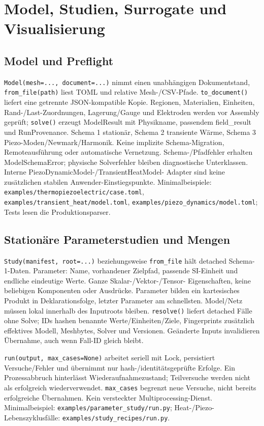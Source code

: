 \chapter{Model, Studien, Surrogate und Visualisierung}
\label{api:workflows}
\begingroup\raggedright
\section{Model und Preflight}
\texttt{Model(mesh=..., document=...)} nimmt einen unabhängigen Dokumentstand,
\texttt{from\_file(path)} liest TOML und relative Mesh-/CSV-Pfade.
\texttt{to\_document()} liefert eine getrennte JSON-kompatible Kopie.
Regionen, Materialien, Einheiten, Rand-/Last-Zuordnungen, Lagerung/Gauge und
Elektroden werden vor Assembly geprüft; \texttt{solve()} erzeugt ModelResult
mit Physikname, passendem field\_result und RunProvenance. Schema 1 stationär,
Schema 2 transiente Wärme, Schema 3 Piezo-Moden/Newmark/Harmonik.
Keine implizite Schema-Migration, Remoteausführung oder automatische Vernetzung.
Schema-/Pfadfehler erhalten ModelSchemaError; physische Solverfehler bleiben
diagnostische Unterklassen. Interne PiezoDynamicModel-/TransientHeatModel-
Adapter sind keine zusätzlichen stabilen Anwender-Einstiegspunkte.
Minimalbeispiele: \nolinkurl{examples/thermopiezoelectric/case.toml},
\nolinkurl{examples/transient_heat/model.toml},
\nolinkurl{examples/piezo_dynamics/model.toml}; Tests lesen die Produktionsparser.

\section{Stationäre Parameterstudien und Mengen}
\texttt{Study(manifest, root=...)} beziehungsweise \texttt{from\_file}
hält detached Schema-1-Daten. Parameter: Name, vorhandener Zielpfad,
passende SI-Einheit und endliche eindeutige Werte. Ganze Skalar-/Vektor-/Tensor-
Eigenschaften, keine beliebigen Komponenten oder Ausdrücke. Parameter bilden
ein kartesisches Produkt in Deklarationsfolge, letzter Parameter am schnellsten.
Model/Netz müssen lokal innerhalb des Inputroots bleiben. \texttt{resolve()}
liefert detached Fälle ohne Solve; IDs hashen benannte Werte/Einheiten/Ziele,
Fingerprints zusätzlich effektives Modell, Meshbytes, Solver und Versionen.
Geänderte Inputs invalidieren Übernahme, auch wenn Fall-ID gleich bleibt.

\texttt{run(output, max\_cases=None)} arbeitet seriell mit Lock, persistiert
Versuche/Fehler und übernimmt nur hash-/identitätsgeprüfte Erfolge. Ein
Prozessabbruch hinterlässt Wiederaufnahmezustand; Teilversuche werden nicht
als erfolgreich wiederverwendet. \texttt{max\_cases} begrenzt neue Versuche,
nicht bereits erfolgreiche Übernahmen. Kein versteckter Multiprocessing-Dienst.
Minimalbeispiel: \nolinkurl{examples/parameter_study/run.py}; Heat-/Piezo-
Lebenszyklusfälle: \nolinkurl{examples/study_recipes/run.py}.

